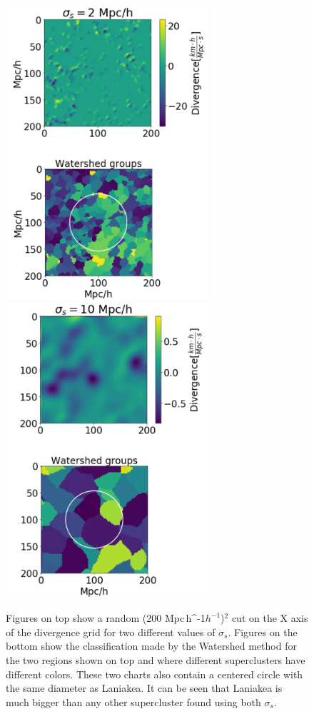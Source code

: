 \documentclass[usenatbib]{mnras}
\newcommand{\Mpch}{\,{\rm Mpc}\,\ifmmode h^{-1}\else $h^{-1}$\fi}
\begin{document}
\begin{figure}
    \centering
    \includegraphics[width=212pt]{smooth_watershed_01.pdf}
    \includegraphics[width=211pt]{smooth_watershed_05.pdf}
    \caption{Figures on top show a random (200\,\Mpch)$^2$ cut on the
      X axis of the divergence grid for two different values of
      $\sigma_s$. Figures on the bottom show the classification made
      by the Watershed method for the two regions shown on top and
      where different superclusters have different colors. These two
      charts also contain a centered circle with the same diameter as
      Laniakea. It can be seen that Laniakea is much bigger than any
      other supercluster found using both $\sigma_s$.} 
    \label{fig:1Pert}
\end{figure}
\end{document}
